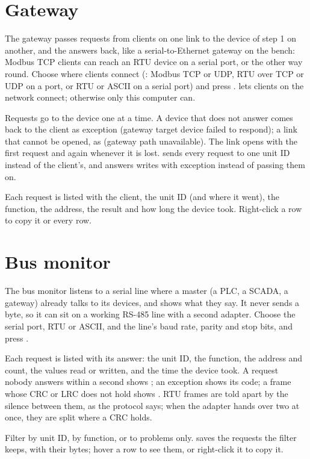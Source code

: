 \section{Gateway}

The gateway passes requests from clients on one link to the device of step 1
on another, and the answers back, like a serial-to-Ethernet gateway on the
bench: Modbus TCP clients can reach an RTU device on a serial port, or the
other way round. Choose where clients connect (: Modbus TCP or
UDP, RTU over TCP or UDP on a port, or RTU or ASCII on a serial port) and
press .  lets clients on the network connect;
otherwise only this computer can.

Requests go to the device one at a time. A device that does not answer comes
back to the client as exception  (gateway target device failed to
respond); a link that cannot be opened, as  (gateway path
unavailable). The link opens with the first request and again whenever it is
lost.  sends every request to one unit ID instead of the
client's, and  answers writes with exception 
instead of passing them on.

Each request is listed with the client, the unit ID (and where it went), the
function, the address, the result and how long the device took. Right-click a
row to copy it or every row.

\section{Bus monitor}

The bus monitor listens to a serial line where a master (a PLC, a SCADA, a
gateway) already talks to its devices, and shows what they say. It never
sends a byte, so it can sit on a working RS-485 line with a second adapter.
Choose the serial port, RTU or ASCII, and the line's baud rate, parity and
stop bits, and press .

Each request is listed with its answer: the unit ID, the function, the
address and count, the values read or written, and the time the device took.
A request nobody answers within a second shows ; an exception
shows its code; a frame whose CRC or LRC does not hold shows .
RTU frames are told apart by the silence between them, as the protocol says;
when the adapter hands over two at once, they are split where a CRC holds.

Filter by unit ID, by function, or to problems only.  saves
the requests the filter keeps, with their bytes; hover a row to see them, or
right-click it to copy it.

